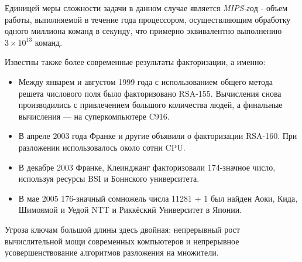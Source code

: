 Единицей меры сложности задачи в данном случае является \textit{MIPS-го}д - объем работы, выполняемой в течение года процессором, осуществляющим обработку одного миллиона команд в секунду, что примерно эквивалентно выполнению {$3\times10^{13}$} команд.  
  
Известны также более современные результаты факторизации, а именно:  
    \begin{itemize}
      \item Между январем и августом 1999 года с использованием общего метода решета числового поля было факторизовано RSA-155. Вычисления снова производились с 
	привлечением большого количества людей, а финальные вычисления — на суперкомпьютере C916.
      \item В апреле 2003 года Франке и другие объявили о факторизации RSA-160. При разложении использовалось около сотни CPU.
      \item В декабре 2003 Франке, Клеинджанг факторизовали 174-значное число, используя ресурсы BSI и Боннского университета.
      \item В мае 2005 176-значный сомножель числа 11281 + 1 был найден Аоки, Кида, Шимоямой и Уедой NTT и Риккёский Университет в Японии.
    \end{itemize}
  
Угроза ключам большой длины здесь двойная: непрерывный рост вычислительной мощи современных компьютеров и непрерывное 
  усовершенствование алгоритмов разложения на множители.



